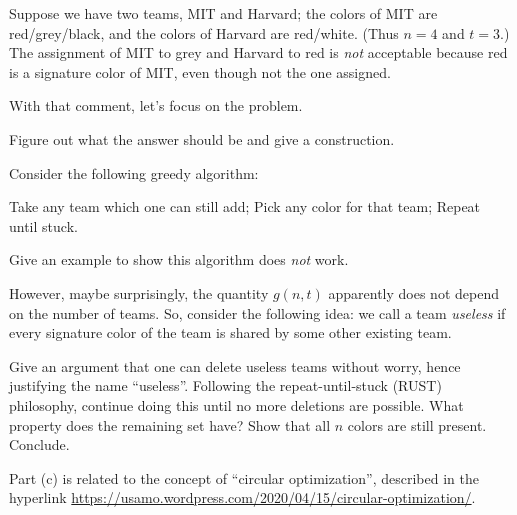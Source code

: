 Suppose we have two teams, MIT and Harvard;
the colors of MIT are red/grey/black, and
the colors of Harvard are red/white.
(Thus $n=4$ and $t=3$.)
The assignment of MIT to grey and Harvard to red
is \emph{not} acceptable because red is a
signature color of MIT, even though not the one assigned.

With that comment, let's focus on the problem.

\begin{walk}
  \ii Figure out what the answer should be
  and give a construction.

  \ii Consider the following greedy algorithm:
  \begin{itemize}
    \ii Take any team which one can still add;
    \ii Pick any color for that team;
    \ii Repeat until stuck.
  \end{itemize}
  Give an example to show this algorithm
  does \emph{not} work.
\end{walk}
However, maybe surprisingly, the quantity $g(n,t)$
apparently does not depend on the number of teams.
So, consider the following idea:
we call a team \emph{useless} if every signature color
of the team is shared by some other existing team.
\begin{walk}[resume]
  \ii Give an argument that one can delete useless teams
  without worry, hence justifying the name ``useless''.
  \ii Following the repeat-until-stuck (RUST) philosophy,
  continue doing this until no more deletions are possible.
  What property does the remaining set have?
  \ii Show that all $n$ colors are still present.
  \ii Conclude.
\end{walk}
Part (c) is related to the concept of ``circular optimization'',
described in the hyperlink
\url{https://usamo.wordpress.com/2020/04/15/circular-optimization/}.
